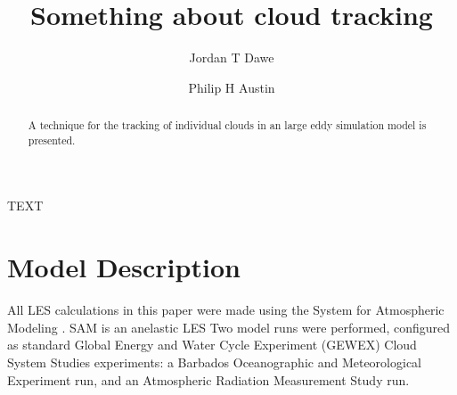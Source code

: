 \documentclass[acp]{copernicus}
\begin{document}
\title{Something about cloud tracking}


\author[1]{Jordan T Dawe}
\author[1]{Philip H Austin}










\received{}
\pubdiscuss{} %
\revised{}
\accepted{}
\published{}




\maketitle



\begin{abstract}
A technique for the tracking of individual clouds in an large eddy 
simulation model is presented.
\end{abstract}





\introduction
TEXT



\section{Model Description}

All LES calculations in this paper were made using the System for Atmospheric 
Modeling \citep[SAM;][]{Khairoutdinov2003}.  SAM is an anelastic LES 
Two model runs were performed, 
configured as standard Global Energy and Water Cycle Experiment (GEWEX) 
Cloud System Studies \citep[GCSS;][]{Randall2003} experiments: a Barbados 
Oceanographic and Meteorological Experiment \citep[BOMEX;][]{Siebesma2003} run,
and an Atmospheric Radiation Measurement Study \citep[ARM;][]{Brown2002} run. 
\end{document}

